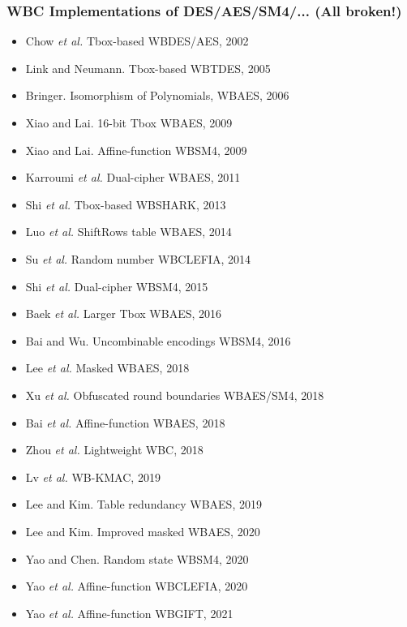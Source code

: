 \documentclass{beamer}
\begin{document}
\frame
{
 \frametitle{WBC Implementations of DES/AES/SM4/... (All broken!)}
 \begin{itemize}
  \item Chow \textit{et al.} Tbox-based WBDES/AES, 2002
  \item Link and Neumann. Tbox-based WBTDES, 2005
  \item Bringer. Isomorphism of Polynomials, WBAES, 2006
  \item Xiao and Lai. 16-bit Tbox WBAES, 2009
  \item Xiao and Lai. Affine-function WBSM4, 2009
  \item Karroumi \textit{et al.} Dual-cipher WBAES, 2011
  \item Shi \textit{et al.} Tbox-based WBSHARK, 2013
  \item Luo \textit{et al.} ShiftRows table WBAES, 2014
  \item Su \textit{et al.} Random number WBCLEFIA, 2014
  \item Shi \textit{et al.} Dual-cipher WBSM4, 2015
  \end{itemize}
}

\frame
{
 \begin{itemize}
  \item Baek \textit{et al.} Larger Tbox WBAES, 2016
  \item Bai and Wu. Uncombinable encodings WBSM4, 2016
  \item Lee \textit{et al.} Masked WBAES, 2018
  \item Xu \textit{et al.} Obfuscated round boundaries WBAES/SM4, 2018
  \item Bai \textit{et al.} Affine-function WBAES, 2018
  \item Zhou \textit{et al.} Lightweight WBC, 2018
  \item Lv \textit{et al.} WB-KMAC, 2019
  \item Lee and Kim. Table redundancy WBAES, 2019
  \item Lee and Kim. Improved masked WBAES, 2020
  \item Yao and Chen. Random state WBSM4, 2020
  \item Yao \textit{et al.} Affine-function WBCLEFIA, 2020
  \item Yao \textit{et al.} Affine-function WBGIFT, 2021
 \end{itemize}
}
\end{document}
